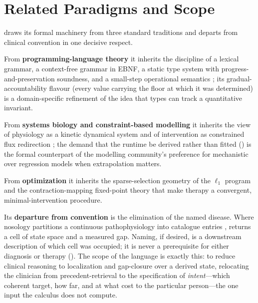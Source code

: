 \section{Related Paradigms and Scope}
\label{cfc:sec:related}

 draws its formal machinery from three standard traditions and departs
from clinical convention in one decisive respect.

From \textbf{programming-language theory} it inherits the discipline of a
lexical grammar, a context-free grammar in EBNF, a static type system with
progress-and-preservation soundness, and a small-step operational semantics
\citep{aho2006compilers,pierce2002types,wright1994syntactic,plotkin2004structural};
its gradual-accountability flavour (every value carrying the floor at which it
was determined) is a domain-specific refinement of the idea that types can
track a quantitative invariant.

From \textbf{systems biology and constraint-based modelling} it inherits the
view of physiology as a kinetic dynamical system and of intervention as
constrained flux redirection \citep{kitano2002systems,palsson2015systems,%
orth2010fba}; the demand that the runtime be derived rather than fitted
() is the formal counterpart of the modelling community's
preference for mechanistic over regression models when extrapolation matters.

From \textbf{optimization} it inherits the sparse-selection geometry of the
$\ell_1$ program \citep{tibshirani1996lasso,candes2006robust,boyd2004convex} and
the contraction-mapping fixed-point theory \citep{Banach1922} that make therapy
a convergent, minimal-intervention procedure.

Its \textbf{departure from convention} is the elimination of the named disease.
Where nosology partitions a continuous pathophysiology into catalogue entries
\citep{feinstein1967clinical,scheuermann2009toward,loscalzo2007network},
 returns a cell of state space and a measured gap. Naming, if desired,
is a downstream description of which cell was occupied; it is never a
prerequisite for either diagnosis or therapy (). The
scope of the language is exactly this: to reduce clinical reasoning to
localization and gap-closure over a derived state, relocating the clinician from
precedent-retrieval to the specification of \emph{intent}---which coherent
target, how far, and at what cost to the particular person---the one input the
calculus does not compute.


